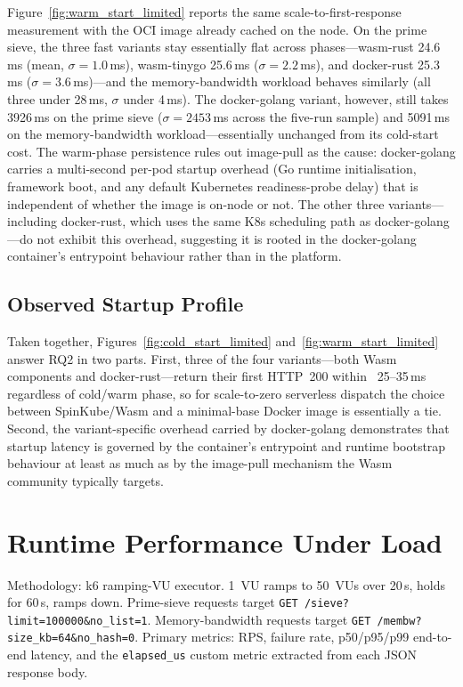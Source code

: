 Figure~\ref{fig:warm_start_limited} reports the same scale-to-first-response measurement with the \acs{OCI} image already cached on the node. On the prime sieve, the three fast variants stay essentially flat across phases---wasm-rust 24.6\,ms (mean, $\sigma=1.0$\,ms), wasm-tinygo 25.6\,ms ($\sigma=2.2$\,ms), and docker-rust 25.3\,ms ($\sigma=3.6$\,ms)---and the memory-bandwidth workload behaves similarly (all three under 28\,ms, $\sigma$ under 4\,ms). The docker-golang variant, however, still takes 3926\,ms on the prime sieve ($\sigma=2453$\,ms across the five-run sample) and 5091\,ms on the memory-bandwidth workload---essentially unchanged from its cold-start cost. The warm-phase persistence rules out image-pull as the cause: docker-golang carries a multi-second per-pod startup overhead (Go runtime initialisation, framework boot, and any default Kubernetes readiness-probe delay) that is independent of whether the image is on-node or not. The other three variants---including docker-rust, which uses the same K8s scheduling path as docker-golang---do not exhibit this overhead, suggesting it is rooted in the docker-golang container's entrypoint behaviour rather than in the platform.

\subsection{Observed Startup Profile}

Taken together, Figures~\ref{fig:cold_start_limited} and~\ref{fig:warm_start_limited} answer RQ2 in two parts. First, three of the four variants---both Wasm components and docker-rust---return their first \acs{HTTP}~200 within ~25--35\,ms regardless of cold/warm phase, so for scale-to-zero serverless dispatch the choice between SpinKube/Wasm and a minimal-base Docker image is essentially a tie. Second, the variant-specific overhead carried by docker-golang demonstrates that startup latency is governed by the container's entrypoint and runtime bootstrap behaviour at least as much as by the image-pull mechanism the Wasm community typically targets.

\section{Runtime Performance Under Load}
\label{sec:eval_performance}

\begin{sloppypar}
Methodology: k6 ramping-\acs{VU} executor. 1~\acs{VU} ramps to 50~\acp{VU} over 20\,s, holds for 60\,s, ramps down. Prime-sieve requests target \texttt{GET /sieve?limit=100000\&no\_list=1}. Memory-bandwidth requests target \texttt{GET /membw?size\_kb=64\&no\_hash=0}. Primary metrics: \acs{RPS}, failure rate, p50/p95/p99 end-to-end latency, and the \texttt{elapsed\_us} custom metric extracted from each \acs{JSON} response body.
\end{sloppypar}

